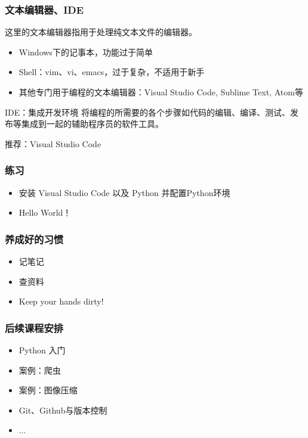 \documentclass[10pt]{beamer}
\begin{document}
\begin{frame}
\frametitle{文本编辑器、IDE}

这里的文本编辑器指用于处理纯文本文件的编辑器。

\begin{itemize}
    \item Windows下的记事本，功能过于简单
    \item Shell：vim、vi、emacs，过于复杂，不适用于新手
    \item 其他专门用于编程的文本编辑器：Visual Studio Code, Sublime Text, Atom等
\end{itemize}

\begin{block}{IDE：集成开发环境}
    将编程的所需要的各个步骤如代码的编辑、编译、测试、发布等集成到一起的辅助程序员的软件工具。
\end{block}

推荐：Visual Studio Code

\end{frame}


\begin{frame}
    \frametitle{练习}
    \begin{itemize}
        \item 安装 Visual Studio Code 以及 Python 并配置Python环境
        \item Hello World！
    \end{itemize}
    
\end{frame}


\begin{frame}
\frametitle{养成好的习惯}

\begin{itemize}
    \item 记笔记
    \item 查资料
    \item Keep your hands dirty!
\end{itemize}
\end{frame}

\begin{frame}
\frametitle{后续课程安排}
\begin{itemize}
    \item Python 入门
    \item 案例：爬虫
    \item 案例：图像压缩
    \item Git、Github与版本控制
    \item ...
\end{itemize}
\end{frame}
\end{document}
